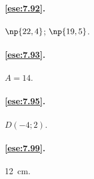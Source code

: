 \paragraph{\ref{ese:7.92}.}
$\np{22,4}$; $\np{19,5}$.

\paragraph{\ref{ese:7.93}.}
$A=14$.

\paragraph{\ref{ese:7.95}.}
$D(-4;2)$.

\paragraph{\ref{ese:7.99}.}
12~cm.

\endgroup
